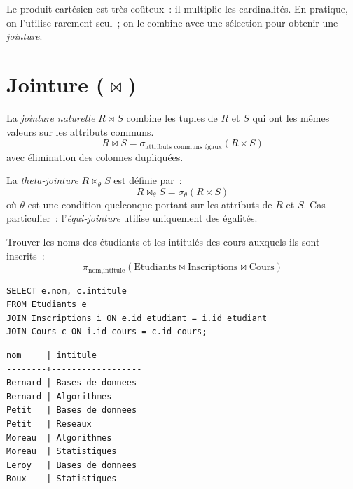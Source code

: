 \begin{attention}[title=\textbf{Co\^ut du produit cart\'esien}]
Le produit cart\'esien est tr\`es co\^uteux~: il multiplie les cardinalit\'es.
En pratique, on l'utilise rarement seul~; on le combine avec une s\'election
pour obtenir une \emph{jointure}.
\end{attention}

\section{Jointure ($\bowtie$)}

\begin{definition}
La \emph{jointure naturelle} $R \bowtie S$ combine les tuples de $R$ et $S$
qui ont les m\^emes valeurs sur les attributs communs.
\[
R \bowtie S = \sigma_{\text{attributs communs \'egaux}}(R \times S)
\]
avec \'elimination des colonnes dupliqu\'ees.
\end{definition}

\begin{definition}
La \emph{theta-jointure} $R \bowtie_\theta S$ est d\'efinie par~:
\[
R \bowtie_\theta S = \sigma_\theta(R \times S)
\]
o\`u $\theta$ est une condition quelconque portant sur les attributs de $R$ et $S$.
Cas particulier~: l'\emph{\'equi-jointure} utilise uniquement des \'egalit\'es.
\end{definition}

\begin{exemple}
Trouver les noms des \'etudiants et les intitul\'es des cours auxquels ils sont inscrits~:
\[
\pi_{\text{nom}, \text{intitule}}(\text{Etudiants} \bowtie \text{Inscriptions} \bowtie \text{Cours})
\]

\begin{codeblock}[title=\textbf{Jointure en SQL}]
\begin{verbatim}
SELECT e.nom, c.intitule
FROM Etudiants e
JOIN Inscriptions i ON e.id_etudiant = i.id_etudiant
JOIN Cours c ON i.id_cours = c.id_cours;
\end{verbatim}
\end{codeblock}

\begin{codeoutput}
\begin{verbatim}
nom     | intitule
--------+------------------
Bernard | Bases de donnees
Bernard | Algorithmes
Petit   | Bases de donnees
Petit   | Reseaux
Moreau  | Algorithmes
Moreau  | Statistiques
Leroy   | Bases de donnees
Roux    | Statistiques
\end{verbatim}
\end{codeoutput}
\end{exemple}

